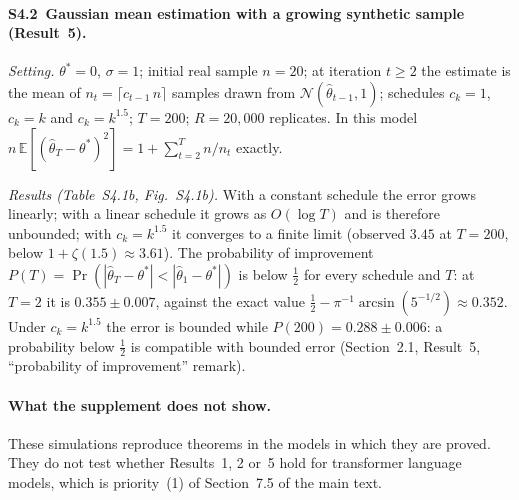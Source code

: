 \paragraph{S4.2~Gaussian mean estimation with a growing synthetic sample
(Result~5).}
\emph{Setting.} $\theta^\ast=0$, $\sigma=1$; initial real sample $n=20$; at
iteration $t\ge2$ the estimate is the mean of $n_t=\lceil c_{t-1}\,n\rceil$ samples
drawn from $\mathcal N(\hat\theta_{t-1},1)$; schedules $c_k=1$, $c_k=k$ and
$c_k=k^{1.5}$; $T=200$; $R=20{,}000$ replicates.
In this model $n\,\mathbb{E}[(\hat\theta_T-\theta^\ast)^2]
= 1 + \sum_{t=2}^{T} n/n_t$ exactly.

\emph{Results (Table~S4.1b, Fig.~S4.1b).}
With a constant schedule the error grows linearly; with a linear schedule it grows
as $O(\log T)$ and is therefore unbounded; with $c_k=k^{1.5}$ it converges to a
finite limit (observed $3.45$ at $T=200$, below $1+\zeta(1.5)\approx3.61$).
The probability of improvement
$P(T)=\Pr(|\hat\theta_T-\theta^\ast|<|\hat\theta_1-\theta^\ast|)$ is below
$\tfrac12$ for every schedule and $T$: at $T=2$ it is $0.355\pm0.007$, against the
exact value $\tfrac12 - \pi^{-1}\arcsin(5^{-1/2}) \approx 0.352$.
Under $c_k=k^{1.5}$ the error is bounded while $P(200) = 0.288\pm0.006$: a
probability below $\tfrac12$ is compatible with bounded error
(Section~2.1, Result~5, ``probability of improvement'' remark).

\paragraph{What the supplement does not show.}
These simulations reproduce theorems in the models in which they are proved.
They do not test whether Results~1, 2 or~5 hold for transformer language models,
which is priority~(1) of Section~7.5 of the main text.

